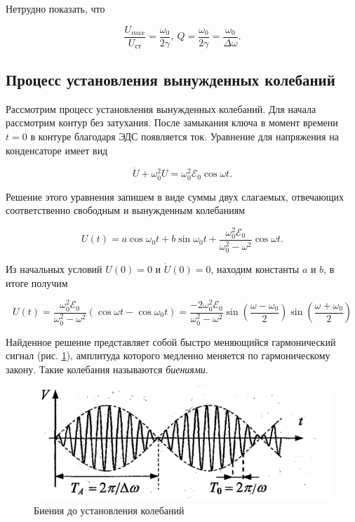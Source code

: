 \documentclass[a4paper, 12pt]{article}
\begin{document}
    Нетрудно показать, что

    \begin{equation}
        \frac{U_{max}}{U_\text{ст}} = \frac{\omega_0}{2 \gamma}, \: Q = \frac{\omega_0}{2 \gamma} = \frac{\omega_0}{\Delta \omega}.
    \end{equation}

    \subsection{Процесс установления вынужденных колебаний}

    Рассмотрим процесс установления вынужденных колебаний. Для начала рассмотрим контур без затухания. После замыкания ключа в момент времени $t = 0$ в контуре благодаря ЭДС появляется ток. Уравнение для напряжения на конденсаторе имеет вид

    \begin{equation}
        \Dot{U} + \omega_0^2 U = \omega_0^2 \mathcal{E}_0 \cos \omega t.
    \end{equation}

    Решение этого уравнения запишем в виде суммы двух слагаемых, отвечающих соответственно свободным и вынужденным колебаниям

    \begin{equation}
        U(t) = a \cos{\omega_0 t} + b \sin{\omega_0 t} + \frac{\omega_0^2 \mathcal{E}_0}{\omega_0^2 - \omega^2} \cos{\omega t}.
    \end{equation}

    Из начальных условий $U(0) = 0$ и $\Dot{U}(0) = 0$, находим константы $a$ и $b$, в итоге получим

    \begin{equation}
        U(t) = \frac{\omega_0^2 \mathcal{E}_0}{\omega_0^2 - \omega^2} (\cos{\omega t} - \cos{\omega_0 t}) = \frac{-2 \omega_0^2 \mathcal{E}_0}{\omega_0^2 - \omega^2} \sin{(\frac{\omega - \omega_0}{2})} \sin{(\frac{\omega + \omega_0}{2})} 
    \end{equation}

    Найденное решение представляет собой быстро меняющийся гармонический сигнал (рис. \ref{pulse}), амплитуда которого медленно меняется по гармоническому закону. Такие колебания называются \textit{биениями}.

    \begin{figure}[H]
        \centering
        \includegraphics[scale = 0.5]{images/pulse.png}
        \caption{Биения до установления колебаний}
        \label{pulse}
    \end{figure}
\end{document}

